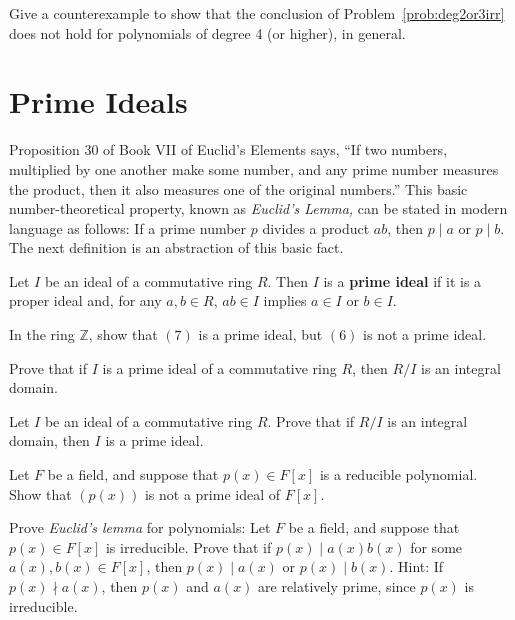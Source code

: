 \begin{problem}
Give a counterexample to show that the conclusion of Problem~\ref{prob:deg2or3irr} does not hold for polynomials of degree 4 (or higher), in general.
\end{problem}

\section{Prime Ideals}
Proposition 30 of Book VII of Euclid's Elements says, ``If two numbers, multiplied by one another make some number, and any prime number measures the product, then it also measures one of the original numbers.'' This basic number-theoretical property, known as \emph{Euclid's Lemma,} can be stated in modern language as follows: If a prime number \(p\) divides a product \(ab\), then \(p\mid a\) or \(p \mid b\). The next definition is an abstraction of this basic fact.

\begin{definition}
Let \(I\) be an ideal of a commutative ring \(R\). Then \(I\) is a \textbf{prime ideal} if it is a proper ideal and, for any \(a,b\in R\), \(ab \in I\) implies \(a \in I\) or \(b \in I\).
\end{definition}

\begin{problem}
In the ring \(\mathbb{Z}\), show that \((7)\) is a prime ideal, but \((6)\) is not a prime ideal.
\end{problem}

\begin{problem}
Prove that if \(I\) is a prime ideal of a commutative ring \(R\), then \(R/I\) is an integral domain.
\end{problem}

\begin{problem}
Let \(I\) be an ideal of a commutative ring \(R\). Prove that if \(R/I\) is an integral domain, then \(I\) is a prime ideal.
\end{problem}

\begin{problem}
Let \(F\) be a field, and suppose that \(p(x) \in F[x]\) is a reducible polynomial. Show that \((p(x))\) is not a prime ideal of \(F[x]\).
\end{problem}

\begin{problem}
Prove \emph{Euclid's lemma} for polynomials: Let \(F\) be a field, and suppose that \(p(x)\in F[x]\) is irreducible. Prove that if \(p(x) \mid a(x)b(x)\) for some \(a(x),b(x)\in F[x]\), then \(p(x) \mid a(x)\) or \(p(x) \mid b(x)\). Hint: If \(p(x) \nmid a(x)\), then \(p(x)\) and \(a(x)\) are relatively prime, since \(p(x)\) is irreducible.
\end{problem}

